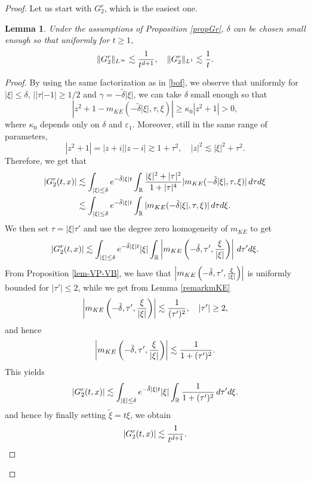 \documentclass[11pt]{amsart}
\numberwithin{equation}{section}
\newtheorem{lem}{Lemma}[section]
\newcommand{\eps}{\varepsilon}
\begin{document}
\begin{proof}
Let us start with $G^r_{2}$, which is the easiest one.
\begin{lem}
\label{lemGr2} Under the assumptions of Proposition \ref{propGr}, 
 $\delta$ can be chosen small enough so that  uniformly for $t \geq 1$,
 $$ \|G^r_{2}\|_{L^\infty} \lesssim { 1 \over t^{d+1}}, \quad   \|G^r_{2}\|_{L^1} \lesssim { 1 \over t}.$$
\end{lem}
\begin{proof}
 By using the same factorization as in  \eqref{bof}, we observe that  
uniformly   for $ |\xi| \leq \delta$, $| |\tau|-1| \geq 1/2$ and $\gamma= -\tilde \delta |\xi|$,  we can take $\delta$ small enough so that
 \begin{equation}
 \label{below1} | z^2 + 1 -m_{KE}( - \tilde \delta | \xi|, \tau, \xi) | \geq \kappa_{0}  |z^2 + 1|>0,
 \end{equation} 
where $\kappa_{0}$ depends only on $\delta$ and $\eps_{1}$.  
Moreover, still in the same range of parameters, 
\begin{equation}
\label{below2} |z^2+ 1| = |z+i| |z- i| \gtrsim  1 + \tau^2, \quad |z|^2 \lesssim |\xi|^2 + \tau^2.
\end{equation}
  Therefore, we get that 
  \begin{multline*}
  |G^r_{2}(t,x) | \lesssim   \int_{| \xi | \leq \delta }  e^{ - \tilde \delta | \xi | t} \int_{\mathbb{R}} {   |\xi|^2 + |\tau |^2 \over 1 + |\tau |^4} |m_{KE}(-  \tilde \delta | \xi |, \tau, \xi) | \, d\tau d \xi
 \\ \lesssim 
   \int_{| \xi | \leq \delta }  e^{ - \tilde \delta | \xi | t} \int_{\mathbb{R}} |m_{KE}(-  \tilde \delta | \xi |, \tau, \xi) | \, d\tau d \xi.
   \end{multline*}
   We then set $\tau= | \xi | \tau'$ and use the degree zero  homogeneity of $m_{KE}$ to get
   $$  |G^r_{2}(t,x) | \lesssim   \int_{| \xi | \leq \delta}  e^{ - \tilde \delta | \xi | t} | \xi|  \int_{\mathbb{R}}
   \left|m_{KE}\left(-  \tilde \delta , \tau', {\xi \over | \xi|}\right) \right| \, d\tau' d \xi. $$
   From  Proposition \ref{lem-VP-VB}, we have that  $\left|m_{KE}\left(-  \tilde \delta , \tau', {\xi \over | \xi|}\right)\right|$
    is uniformly bounded for $|\tau'| \leq 2$, while we get from Lemma \ref{remarkmKE}
     $$   \left|m_{KE}\left(-  \tilde \delta , \tau', {\xi \over | \xi|}\right) \right| \lesssim { 1 \over (\tau')^2}, \quad
      |\tau'| \geq 2,$$
       and hence 
       \begin{equation}
       \label{estimmke}
   \left|m_{KE}\left(-  \tilde \delta , \tau', {\xi \over | \xi|}\right) \right| \lesssim { 1 \over 1 +  (\tau')^2}.
\end{equation}
This yields
   $$  |G^r_{2}(t,x) | \lesssim   \int_{| \xi | \leq \delta}  e^{ - \tilde \delta | \xi | t} | \xi|  \int_{\mathbb{R}}  { 1 \over 1 +  (\tau')^2}\, d\tau' d \xi. $$
   and hence by finally setting $\tilde \xi = t \xi$, we obtain
   $$ |G^r_{2}(t,x) | \lesssim { 1 \over t^{d+1}}.$$ 
   

\end{proof}
\end{proof}
\end{document}
